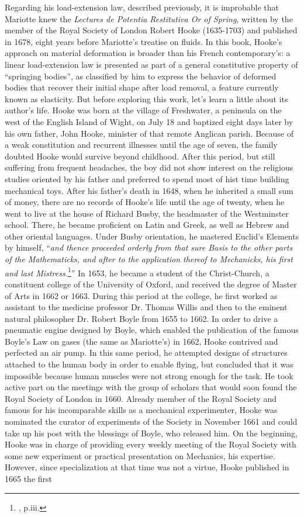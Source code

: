 Regarding his load-extension law, described previously, it is improbable that Mariotte knew the \emph{Lectures \emph{de Potentia Restitutiva} Or of Spring}, written by the member of the Royal Society of London Robert Hooke (1635-1703) and published in 1678, eight years before Mariotte's treatise on fluids. In this book, Hooke's approach on material deformation is broader than his French contemporary's: a linear load-extension law is presented as part of a general constitutive property of ``springing bodies'', as classified by him to express the behavior of deformed bodies that recover their initial shape after load removal, a feature currently known as elasticity. But before exploring this work, let's learn a little about its author's life. Hooke was born at the village of Freshwater, a peninsula on the west of the English Island of Wight, on July 18 and baptized eight days later by his own father, John Hooke, minister of that remote Anglican parish. Because of a weak constitution and recurrent illnesses until the age of seven, the family doubted Hooke would survive beyond childhood. After this period, but still suffering from frequent headaches, the boy did not show interest on the religious studies oriented by his father and preferred to spend most of hist time building mechanical toys. After his father's death in 1648, when he inherited a small sum of money, there are no records of Hooke's life until the age of twenty, when he went to live at the house of Richard Busby, the headmaster of the Westminster school. There, he became proficient on Latin and Greek, as well as Hebrew and other oriental languages. Under Busby orientation, he mastered Euclid's Elements by himself, ``\emph{and thence proceeded orderly from that sure Basis to the other parts of the Mathematicks, and after to the application thereof to Mechanicks, his first and last Mistress.}\footnote{\cite{hooke_1705_1}, p.iii.}'' In 1653, he became a student of the Christ-Church, a constituent college of the University of Oxford, and received the degree of Master of Arts in 1662 or 1663. During this period at the college, he first worked as assistant to the medicine professor Dr. Thomas Willis and then to the eminent natural philosopher Dr. Robert Boyle from 1655 to 1662. In order to drive a pneumatic engine designed by Boyle, which enabled the publication of the famous Boyle's Law on gases (the same as Mariotte's) in 1662, Hooke contrived and perfected an air pump. In this same period, he attempted designs of structures attached to the human body in order to enable flying, but concluded that it was impossible because human muscles were not strong enough for the task. He took active part on the meetings with the group of scholars that would soon found the Royal Society of London in 1660. Already member of the Royal Society and famous for his incomparable skills as a mechanical experimenter, Hooke was nominated the curator of experiments of the Society in November 1661 and could take up his post with the blessings of Boyle, who released him. On the beginning, Hooke was in charge of providing every weekly meeting of the Royal Society with some new experiment or practical presentation on Mechanics, his expertise. However, since specialization at that time was not a virtue, Hooke published in 1665 the first 
